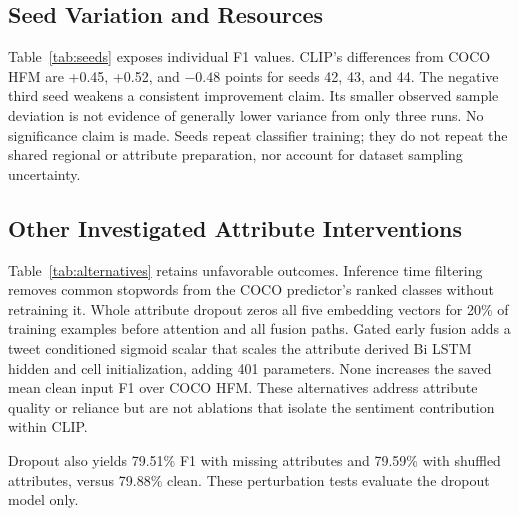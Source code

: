 \documentclass[conference]{IEEEtran}
\begin{document}
\begin{table}[t]
\caption{Descriptive only versus sentiment aware CLIP: test F1 (\%) and paired differences.}
\label{tab:clip-ablation-seeds}
\centering\footnotesize

\end{table}

\subsection{Seed Variation and Resources}
Table~\ref{tab:seeds} exposes individual F1 values. CLIP's differences from COCO HFM are +0.45, +0.52, and $-0.48$ points for seeds 42, 43, and 44. The negative third seed weakens a consistent improvement claim. Its smaller observed sample deviation is not evidence of generally lower variance from only three runs. No significance claim is made. Seeds repeat classifier training; they do not repeat the shared regional or attribute preparation, nor account for dataset sampling uncertainty.

\begin{table}[t]
\caption{Positive class test F1 by seed (\%).}
\label{tab:seeds}
\centering
\small

\end{table}


\subsection{Other Investigated Attribute Interventions}
Table~\ref{tab:alternatives} retains unfavorable outcomes. Inference time filtering removes common stopwords from the COCO predictor's ranked classes without retraining it. Whole attribute dropout zeros all five embedding vectors for 20\% of training examples before attention and all fusion paths. Gated early fusion adds a tweet conditioned sigmoid scalar that scales the attribute derived Bi LSTM hidden and cell initialization, adding 401 parameters. None increases the saved mean clean input F1 over COCO HFM. These alternatives address attribute quality or reliance but are not ablations that isolate the sentiment contribution within CLIP.

\begin{table}[t]
\caption{Alternative attribute interventions, mean test F1 $\pm$ sample SD (\%). Differences are relative to COCO HFM.}
\label{tab:alternatives}
\centering\footnotesize

\end{table}

Dropout also yields 79.51\% F1 with missing attributes and 79.59\% with shuffled attributes, versus 79.88\% clean. These perturbation tests evaluate the dropout model only.
\end{document}
